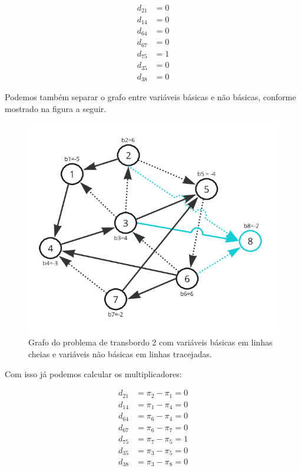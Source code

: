 \documentclass{article}
\begin{document}
\begin{align*}
    d_{21} &= 0 \\
    d_{14} &= 0 \\
    d_{64} &= 0 \\
    d_{67} &= 0 \\
    d_{75} &= 1 \\
    d_{35} &= 0 \\
    d_{38} &= 0
\end{align*}

Podemos também separar o grafo entre variáveis básicas e não básicas, conforme mostrado na figura a seguir.

\begin{figure}[H]
    \centering
    \includegraphics[scale=0.6]{images/q2-sol-inicial.png}
    \caption{Grafo do problema de transbordo 2 com variáveis básicas em linhas cheias e variáveis não básicas em linhas tracejadas.}
\end{figure}

Com isso já podemos calcular os multiplicadores:

\begin{align*}
    d_{21} &= \pi_{2} - \pi_{1} = 0 \\
    d_{14} &= \pi_{1} - \pi_{4} = 0 \\
    d_{64} &= \pi_{6} - \pi_{4} = 0 \\
    d_{67} &= \pi_{6} - \pi_{7} = 0 \\
    d_{75} &= \pi_{7} - \pi_{5} = 1 \\
    d_{35} &= \pi_{3} - \pi_{5} = 0 \\
    d_{38} &= \pi_{3} - \pi_{8} = 0
\end{align*}
\end{document}
